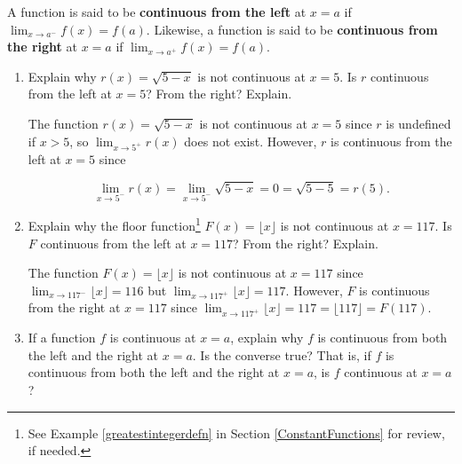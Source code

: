 \documentclass{ximera}
\begin{document}
\begin{problem}\label{onesidedcontinuityexercise}  
A function is said to be \textbf{continuous from the left} at $x=a$ if $\lim_{x \rightarrow a^{-}} f(x) = f(a)$.  Likewise, a function is said to be \textbf{continuous from the right} at $x=a$ if $\lim_{x \rightarrow a^{+}} f(x) = f(a)$.

\begin{enumerate}

\item   Explain why $r(x) = \sqrt{5-x}$ is not continuous at $x = 5$.  Is $r$ continuous from the left at $x=5$?  From the right?  Explain.

\begin{solution}
The function $r(x) = \sqrt{5-x}$ is not continuous at $x = 5$ since $r$ is undefined if $x>5$, so $\lim_{x \rightarrow 5^{+}} r(x)$ does not exist. However, $r$ is continuous from the left at $x = 5$ since 

\[\lim_{x \rightarrow 5^{-}} r(x) =  \lim_{x \rightarrow 5^{-}} \sqrt{5-x} = 0 = \sqrt{5-5} = r(5).\]

\end{solution}

\item  Explain why the floor function\footnote{See Example \ref{greatestintegerdefn} in Section \ref{ConstantFunctions} for review, if needed.} $F(x) = \lfloor x \rfloor$ is not continuous at $x = 117$.   Is $F$ continuous from the left at $x=117$?  From the right?  Explain.

\begin{solution}
The function  $F(x) = \lfloor x \rfloor$ is not continuous at $x = 117$ since $\lim_{x \rightarrow 117^{-}} \lfloor x \rfloor = 116$ but $\lim_{x \rightarrow 117^{+}} \lfloor x \rfloor = 117$.  However, $F$ is continuous from the right at $x = 117$ since $\lim_{x \rightarrow 117^{+}} \lfloor x \rfloor = 117 = \lfloor 117 \rfloor = F(117)$. 
\end{solution}

\item  If a function $f$ is continuous at $x = a$, explain why $f$ is continuous from both the left and the right at $x = a$.  Is the converse true?  That is, if $f$ is continuous from both the left and the right at $x = a$, is $f$ continuous at $x=a$?  


\end{enumerate}
\end{problem}
\end{document}
